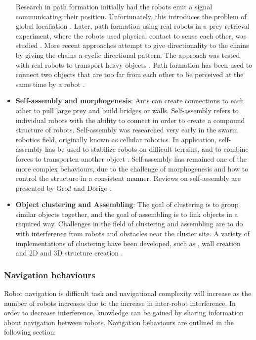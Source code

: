 \begin{itemize}
	Research in path formation initially had the robots emit a signal communicating their position. Unfortunately, this introduces the problem of global localiation \cite{goss1992harvesting}. Later, path formation using real robots in a prey retrieval experiment, where the robots used physical contact to sense each other, was studied \cite{werger1996robotic}. More recent approaches attempt to give directionality to the chains by giving the chains a cyclic directional pattern. The approach was tested with real robots to transport heavy objects \cite{nouyan2006group}. Path formation has been used to connect two objects that are too far from each other to be perceived at the same time by a robot \cite{nouyan2006chain}.

	\item \textbf{Self-assembly and morphogenesis}: 
	Ants can create connections to each other to pull large prey and build bridges or walls. Self-assembly refers to individual robots with the ability to connect in order to create a compound structure of robots. Self-assembly was researched very early in the swarm robotics field, originally known as cellular robotics. In application, self-assembly has be used to stabilize robots on difficult terrains, and to combine forces to transporten another object \cite{brambilla2013swarm}. Self-assembly has remained one of the more complex behaviours, due to the challenge of morphogenesis and how to control the structure in a consistent manner. Reviews on self-assembly are presented by Gro{\ss} and Dorigo \cite{gross2008self}.
	
	\item \textbf{Object clustering and Assembling}:
	The goal of clustering is to group similar objects together, and the goal of assembling is to link objects in a required way. Challenges in the field of clustering and assembling are to do with interference from robots and obstacles near the cluster site. A variety of implementations of clustering have been developed, such as \cite{beckers1994local}, wall creation \cite{wawerla2002collective} and 2D and 3D structure creation \cite{werfel2006extended, werfel2011distributed}. 
\end{itemize}

\subsubsection{Navigation behaviours}
Robot navigation is difficult task and navigational complexity will increase as the number of robots increases due to the increase in inter-robot interference.  In order to decrease interference, knowledge can be gained by sharing information about navigation between robots. Navigation behaviours are outlined in the following section:

